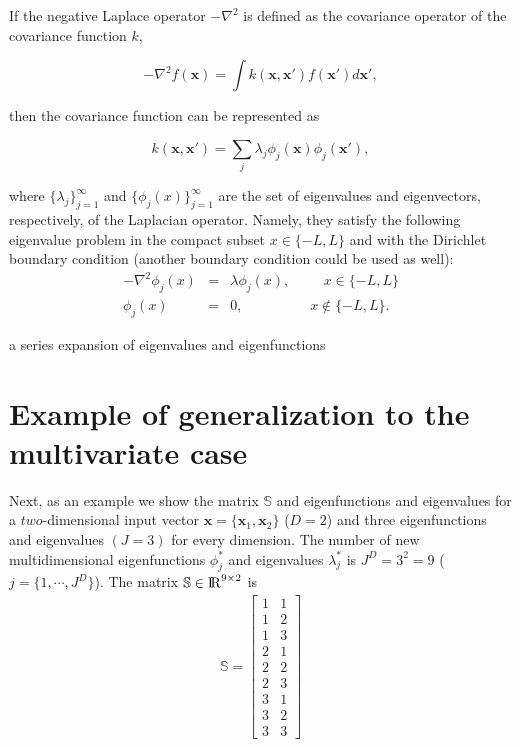 \documentclass[]{interact}
\theoremstyle{plain}%
\theoremstyle{definition}
\theoremstyle{remark}
\begin{document}
If the negative Laplace operator $-\nabla^2$ is defined as the covariance operator of the covariance function $k$,

\begin{equation}
-\nabla^2 f(\bm{x}) = \int k(\bm{x},\bm{x}') f(\bm{x}') d\bm{x}',
\end{equation} 

\noindent then the covariance function can be represented as 

\begin{equation}
k(\bm{x},\bm{x}')= \sum_j \lambda_j \phi_j(\bm{x}) \phi_j(\bm{x}'),
\end{equation}

\noindent where $\{\lambda_j\}_{j=1}^{\infty}$ and $\{\phi_j(x)\}_{j=1}^{\infty}$ are the set of eigenvalues and eigenvectors, respectively, of the Laplacian operator. Namely, they satisfy the following eigenvalue problem in the compact subset $x \in \{-L,L\}$ and with the Dirichlet boundary condition (another boundary condition could be used as well):
%
\begin{eqnarray}
-\nabla^2 \phi_j(x)&=&\lambda \phi_j(x), \hspace{1cm}  x\in \{-L,L\} \nonumber \\ 
\phi_j(x)&=&0, \hspace{2cm} x\notin \{-L,L\}.
\end{eqnarray}  

a series expansion of eigenvalues and eigenfunctions 


\section{Example of generalization to the multivariate case}

Next, as an example we show the matrix $\mathbb{S}$ and eigenfunctions and eigenvalues for a $two$-dimensional input vector $\bm{x}=\{\bm{x}_1,\bm{x}_2\}$ ($D=2$) and three eigenfunctions and eigenvalues $(J=3)$ for every dimension. The number of new multidimensional eigenfunctions $\phi^{\ast}_j$ and eigenvalues $\lambda^{\ast}_j$ is $J^D=3^2=9$ ($j=\{1,\cdots,J^D\}$). The matrix $\mathbb{S}\in {\rm I\!R}^{9 \times 2}$ is
%
\begin{eqnarray}
\mathbb{S}=
\left[ {\begin{array}{cc}
1 & 1 \nonumber \\
1 & 2 \\
1 & 3 \\
2 & 1 \\
2 & 2 \\
2 & 3 \\
3 & 1 \\
3 & 2 \\
3 & 3
\end{array} } \right]
\end{eqnarray} 
\end{document}
